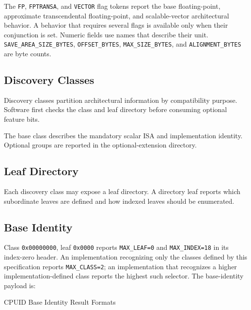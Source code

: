 The \texttt{FP}, \texttt{FPTRANSA}, and \texttt{VECTOR} flag tokens report the
base floating-point, approximate transcendental floating-point, and
scalable-vector architectural behavior. A behavior that requires several flags
is available only when their conjunction is set.
Numeric fields use names that describe their unit. \texttt{SAVE\_AREA\_SIZE\_BYTES},
\texttt{OFFSET\_BYTES}, \texttt{MAX\_SIZE\_BYTES}, and \texttt{ALIGNMENT\_BYTES} are byte counts.

\subsection{Discovery Classes}
Discovery classes partition architectural information by compatibility purpose. Software first checks the class and
leaf directory before consuming optional feature bits.

The base class describes the mandatory scalar ISA and implementation identity. Optional groups are reported
in the optional-extension directory.

\subsection{Leaf Directory}
Each discovery class may expose a leaf directory. A directory leaf reports which subordinate leaves are defined and
how indexed leaves should be enumerated.



\subsection{Base Identity}
Class \texttt{0x00000000}, leaf \texttt{0x0000} reports \texttt{MAX\_LEAF=0} and \texttt{MAX\_INDEX=18} in its
index-zero header. An implementation recognizing only the classes defined by this specification reports
\texttt{MAX\_CLASS=2}; an implementation that recognizes a higher implementation-defined class reports the highest
such selector. The base-identity payload is:

\begin{manuallistedformatdiagram}{CPUID Base Identity Result Formats}
\end{manuallistedformatdiagram}

